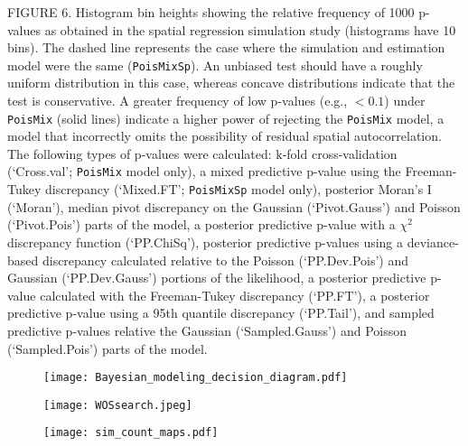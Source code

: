 \documentclass[12pt,english]{article}
\begin{document}
\begin{spacing}{1.9}
    FIGURE 6.  Histogram bin heights showing the relative frequency of
    1000 p-values as obtained in the spatial regression simulation
    study (histograms have 10 bins).  The dashed line represents the
    case where the simulation and estimation model were the same
    (\texttt{PoisMixSp}).  An unbiased test should have a roughly
    uniform distribution in this case, whereas concave distributions
    indicate that the test is conservative.  A greater frequency of
    low p-values (e.g., $<0.1$) under \texttt{PoisMix} (solid lines)
    indicate a higher power of rejecting the \texttt{PoisMix} model, a
    model that incorrectly omits the possibility of residual spatial
    autocorrelation.  The following types of p-values were calculated:
    k-fold cross-validation (`Cross.val'; \texttt{PoisMix} model
    only), a mixed predictive p-value using the Freeman-Tukey
    discrepancy (`Mixed.FT'; \texttt{PoisMixSp} model only), posterior
    Moran's I (`Moran'), median pivot discrepancy on the Gaussian
    (`Pivot.Gauss') and Poisson (`Pivot.Pois') parts of the model, a
    posterior predictive p-value with a $\chi^2$ discrepancy function
    (`PP.ChiSq'), posterior predictive p-values using a deviance-based
    discrepancy calculated relative to the Poisson (`PP.Dev.Pois') and
    Gaussian (`PP.Dev.Gauss') portions of the likelihood, a posterior
    predictive p-value calculated with the Freeman-Tukey discrepancy
    (`PP.FT'), a posterior predictive p-value using a 95th quantile
    discrepancy (`PP.Tail'), and sampled predictive p-values relative
    the Gaussian (`Sampled.Gauss') and Poisson (`Sampled.Pois') parts
    of the model.


    \pagebreak

    \begin{figure*}
      \begin{center}
        \texttt{[image: Bayesian\_modeling\_decision\_diagram.pdf]}
        \caption{} \label{fig:decision}
      \end{center}
    \end{figure*}

    \begin{figure*}
      \begin{center}
        \texttt{[image: WOSsearch.jpeg]}
        \caption{} \label{fig:WOS}
      \end{center}
    \end{figure*}

    \begin{figure*}
      \begin{center}
        \texttt{[image: sim\_count\_maps.pdf]}
        \caption{} \label{fig:sim_maps}
      \end{center}
    \end{figure*}


\end{spacing}
\end{document}
